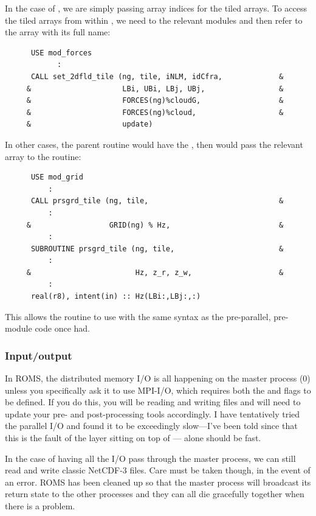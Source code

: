 In the case of , we are simply passing array indices
for the tiled arrays. To access the tiled arrays from within
, we need to  the relevant modules
and then refer to the array with its full name:
\begin{verbatim}
      USE mod_forces
            :
      CALL set_2dfld_tile (ng, tile, iNLM, idCfra,             &
     &                     LBi, UBi, LBj, UBj,                 &
     &                     FORCES(ng)%cloudG,                  &
     &                     FORCES(ng)%cloud,                   &
     &                     update)
\end{verbatim}
In other cases, the parent routine would have the , then
would pass the relevant array to the  routine:
\begin{verbatim}
      USE mod_grid
          :
      CALL prsgrd_tile (ng, tile,                              &
          :
     &                  GRID(ng) % Hz,                         &
          :
      SUBROUTINE prsgrd_tile (ng, tile,                        &
          :
     &                        Hz, z_r, z_w,                    &
          :
      real(r8), intent(in) :: Hz(LBi:,LBj:,:)
\end{verbatim}
This allows the  routine to use  with the same
syntax as the pre-parallel, pre-module code once had.

\subsubsection{Input/output}

In ROMS, the distributed memory I/O is all happening on the master process
(0) unless you specifically ask it to use MPI-I/O, which requires both the
 and   flags to be defined.
If you do this, you will be reading and writing  files and
will need to update your pre- and post-processing tools accordingly. I
have tentatively tried the parallel I/O and found it to be exceedingly
slow---I've been told since that this is the fault of the 
layer sitting on top of --- alone should be fast.

In the case of having all the I/O pass through the master process,
we can still read and write classic NetCDF-3 files. Care must be
taken though, in the event of an error. ROMS has been cleaned up so
that the master process will broadcast its return state to the other
processes and they can all die gracefully together when there is a
problem.

